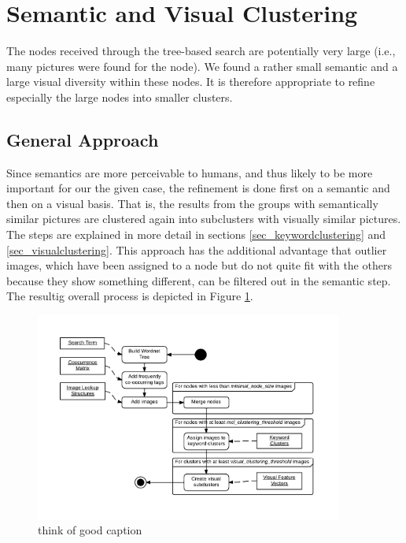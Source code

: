 %
\section{Semantic and Visual Clustering}
\label{sec_inhalt}

The nodes received through the tree-based search are potentially very large (i.e., many pictures were found for the node). We found a rather small semantic and a large visual diversity within these nodes. It is therefore appropriate to refine especially the large nodes into smaller clusters.

\subsection{General Approach}
Since semantics are more perceivable to humans, and thus likely to be more important for our the given case, the refinement is done first on a semantic and then on a visual basis. That is, the results from the groups with semantically similar pictures are clustered again into subclusters with visually similar pictures. The steps are explained in more detail in sections \ref{sec_keywordclustering} and \ref{sec_visualclustering}.
This approach has the additional advantage that outlier images, which have been assigned to a node but do not quite fit with the others because they show something different, can be filtered out in the semantic step. \\
The resultig overall process is depicted in Figure \ref{fig_overallprocess}. 

\begin{figure}[h]
\label{fig_overallprocess}
\centering
\includegraphics[width=0.9\textwidth]{images/searchprocess_diagram_wide.pdf}
\caption{think of good caption}
\end{figure}

